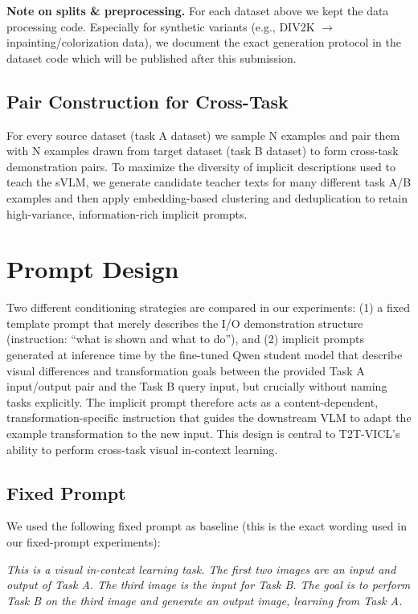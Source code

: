 \noindent \textbf{Note on splits \& preprocessing.} For each dataset above we kept the data processing code. Especially for synthetic variants (e.g., DIV2K $\rightarrow$ inpainting/colorization data), we document the exact generation protocol in the dataset code which will be published after this submission.

\subsection{Pair Construction for Cross-Task}
For every source dataset (task A dataset) we sample N examples and pair them with N examples drawn from target dataset (task B dataset) to form cross-task demonstration pairs. To maximize the diversity of implicit descriptions used to teach the sVLM, we generate candidate teacher texts for many different task A/B examples and then apply embedding-based clustering and deduplication to retain high-variance, information-rich implicit prompts.


\section{Prompt Design}
\label{sec:prompt}

Two different conditioning strategies are compared in our experiments: (1) a fixed template prompt that merely describes the I/O demonstration structure (instruction: ``what is shown and what to do''), and (2) implicit prompts generated at inference time by the fine-tuned Qwen student model that describe visual differences and transformation goals between the provided Task A input/output pair and the Task B query input, but crucially without naming tasks explicitly. The implicit prompt therefore acts as a content-dependent, transformation-specific instruction that guides the downstream VLM to adapt the example transformation to the new input. This design is central to T2T-VICL's ability to perform cross-task visual in-context learning.

\subsection{Fixed Prompt}
We used the following fixed prompt as baseline (this is the exact wording used in our fixed-prompt experiments):

\begin{tcolorbox}[colback=gray!20, colframe=gray!20, boxrule=0pt, left=3pt, right=3pt, top=3pt, bottom=3pt]
\emph{This is a visual in-context learning task. The first two images are an input and output of Task A. The third image is the input for Task B. The goal is to perform Task B on the third image and generate an output image, learning from Task A.}
\end{tcolorbox}

